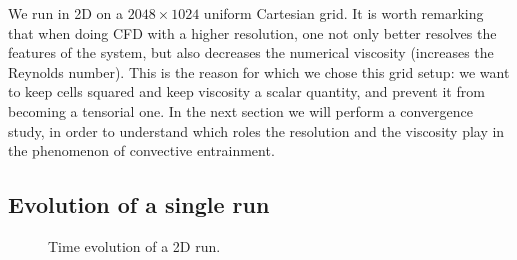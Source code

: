 We run in 2D on a $2048 \times 1024$ uniform Cartesian grid. It is worth remarking that when doing CFD with a higher resolution, one not only better resolves the features of the system, but also decreases the numerical viscosity (increases the Reynolds number). This is the reason for which we chose this grid setup: we want to keep cells squared and keep viscosity a scalar quantity, and prevent it from becoming a tensorial one. In the next section we will perform a convergence study, in order to understand which roles the resolution and the viscosity play in the phenomenon of convective entrainment.\\ 

\subsection{Evolution of a single run}



\begin{figure}[t]
      \centering
     \centering
	\hfill
	\caption{Time evolution of a 2D run.}
	\label{2dsingle}
\end{figure}


